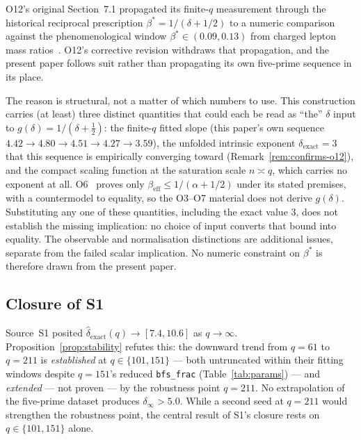 \documentclass[11pt,a4paper]{article}
\theoremstyle{plain}
\theoremstyle{definition}
\newcommand{\dhat}{\hat\delta_{\mathrm{exact}}}
\newcommand{\bstar}{\beta^*}
\begin{document}
    O12's original Section~7.1 propagated its finite-$q$ measurement through
    the historical reciprocal prescription $\bstar=1/(\delta+1/2)$ to
    a numeric comparison against the phenomenological window
    $\bstar\in(0.09,0.13)$ from charged lepton mass ratios~\cite{Beau2026a7}.
    O12's corrective revision withdraws that propagation, and the present paper
    follows suit rather than propagating its own five-prime sequence in its
    place.

    The reason is structural, not a matter of which numbers to use.
    This construction carries (at least) three distinct quantities that could
    each be read as ``the'' $\delta$ input to $g(\delta)=1/(\delta+\tfrac12)$:
    the finite-$q$ fitted slope (this paper's own sequence
    $4.42\to4.80\to4.51\to4.27\to3.59$), the unfolded intrinsic exponent
    $\delta_{\mathrm{exact}}=3$ that this sequence is empirically converging
    toward (Remark~\ref{rem:confirms-o12}), and the compact scaling function at
    the saturation scale $n\asymp q$, which carries no exponent at all.
    O6~\cite{Beau2026a10} proves only $\beta_{\mathrm{eff}}\leq1/(\alpha+1/2)$ under its
    stated premises, with a countermodel to equality, so the O3--O7 material does not derive
    $g(\delta)$.
    Substituting any one of these quantities, including the exact value $3$, does not
    establish the missing implication: no choice of input converts that bound into equality.
    The observable and normalisation distinctions are additional issues, separate from
    the failed scalar implication.
    No numeric constraint on $\bstar$ is therefore drawn from the present
    paper.

  \subsection{Closure of S1}

    Source~S1 posited $\dhat(q) \to [7.4, 10.6]$ as $q \to \infty$.
    Proposition~\ref{prop:stability} refutes this: the downward trend from
    $q = 61$ to $q = 211$ is \emph{established} at $q \in \{101, 151\}$ — both
    untruncated within their fitting windows despite $q=151$'s reduced
    \texttt{bfs\_frac} (Table~\ref{tab:params}) — and \emph{extended} --- not
    proven --- by the robustness point $q = 211$.
    No extrapolation of the five-prime dataset produces $\delta_\infty > 5.0$.
    While a second seed at $q = 211$ would strengthen the robustness point, the
    central result of S1's closure rests on $q \in \{101, 151\}$ alone.
\end{document}
